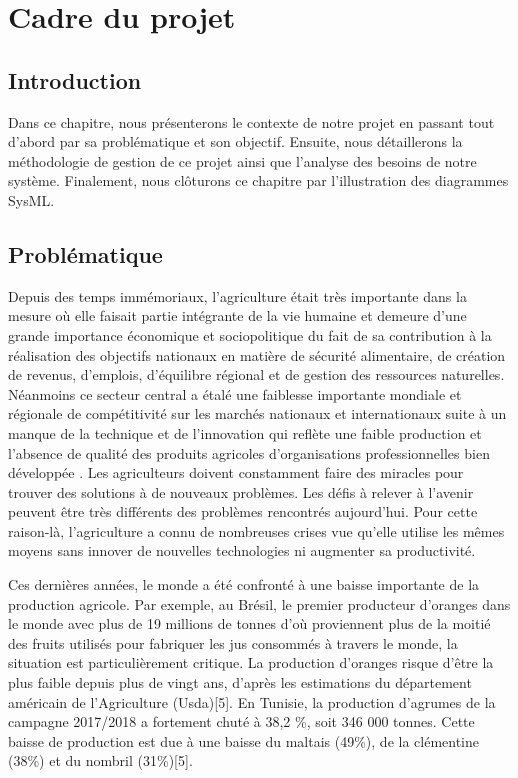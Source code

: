 

	\chapter{Cadre du projet }
	\newpage
	
	
	\section{Introduction }
	Dans ce chapitre, nous présenterons le contexte de notre projet en passant tout d'abord par sa  problématique et son objectif. Ensuite, nous détaillerons la méthodologie de gestion de ce projet ainsi que l'analyse des besoins de notre système. Finalement, nous clôturons ce chapitre par l'illustration des diagrammes SysML.
	
	\section{Problématique }
	Depuis des temps immémoriaux, l'agriculture était très importante dans la mesure où elle faisait partie intégrante de la vie humaine et demeure d’une grande importance économique et sociopolitique du fait de sa contribution à la réalisation des objectifs nationaux en matière de sécurité alimentaire, de création de revenus, d’emplois, d’équilibre régional et de gestion des ressources naturelles. Néanmoins ce secteur central a étalé une faiblesse importante mondiale et régionale de compétitivité sur les marchés nationaux et internationaux suite à un manque de la technique et de l'innovation qui reflète une faible production et l'absence de qualité des produits agricoles d'organisations professionnelles bien développée . Les agriculteurs doivent constamment faire des miracles pour trouver des solutions à de nouveaux problèmes. Les défis à relever à l'avenir peuvent être très différents des problèmes rencontrés aujourd’hui. Pour cette raison-là, l'agriculture a connu de nombreuses crises vue qu’elle utilise les mêmes moyens sans innover de nouvelles technologies ni augmenter sa productivité.
	
	Ces dernières années, le monde a été confronté à une baisse importante de la production agricole. Par exemple, au Brésil, le premier producteur d’oranges dans le monde avec plus de 19 millions de tonnes d'où proviennent plus de la moitié des fruits utilisés pour fabriquer les jus consommés à travers le monde, la situation est particulièrement critique. La production d'oranges risque d'être la plus faible depuis plus de vingt ans, d'après les estimations du département américain de l'Agriculture (Usda)[5]. En Tunisie, la production d'agrumes de la campagne 2017/2018 a fortement chuté à 38,2 \%, soit 346 000 tonnes. Cette baisse de production est due à une baisse du maltais (49\%), de la clémentine (38\%) et du nombril (31\%)[5].
	
